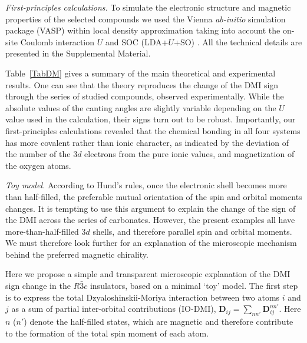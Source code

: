 \documentclass[aps,prl,showpacs,reprint,floatfix]{revtex4-1}
\begin{document}
{\it First-principles calculations.} 
To simulate the electronic structure and magnetic properties of the selected compounds we used the Vienna {\it ab-initio} simulation package (VASP) \cite{VASP1993,VASP1996} 
within local density approximation taking into account the on-site Coulomb interaction $U$ and SOC (LDA+$U$+SO) \cite{Solovyev}. 
All the technical details are presented in the Supplemental Material. 

Table~\ref{TabDM} gives a summary of the main theoretical and experimental results.
One can see that the theory reproduces the change of the DMI sign through the series of studied compounds, observed experimentally. 
While the absolute values of the canting angles are slightly variable depending on the $U$ value used in the calculation, their signs turn out to be robust.  
Importantly, our first-principles calculations revealed that the chemical bonding in all four systems has more covalent rather than ionic character, as indicated
by the deviation of the number of the $3d$ electrons from the pure ionic values, and magnetization of the oxygen atoms. 

{\it Toy model.} 
According to Hund's rules, once the electronic shell becomes more than half-filled, the preferable mutual orientation of the spin and orbital moments changes.
It is tempting to use this argument to explain the change of the sign of the DMI across the series of carbonates. 
However, the present examples all have more-than-half-filled 3$d$ shells, and therefore parallel spin and orbital moments. We must therefore look further 
for an explanation of the microscopic mechanism behind the preferred magnetic chirality.

Here we propose a simple and transparent microscopic explanation of the DMI sign change in the $R\bar{3}c$ insulators, based on a minimal `toy' model.
The first step is to express the total Dzyaloshinskii-Moriya interaction between two atoms $i$ and $j$ as a sum of partial inter-orbital contributions (IO-DMI), $\mathbf{D}_{ij} = \sum_{nn'} \mathbf{D}^{nn'}_{ij}$. 
Here $n$ ($n'$) denote the half-filled states, which are magnetic and therefore contribute to the formation of the total spin moment of each atom.
\end{document}
